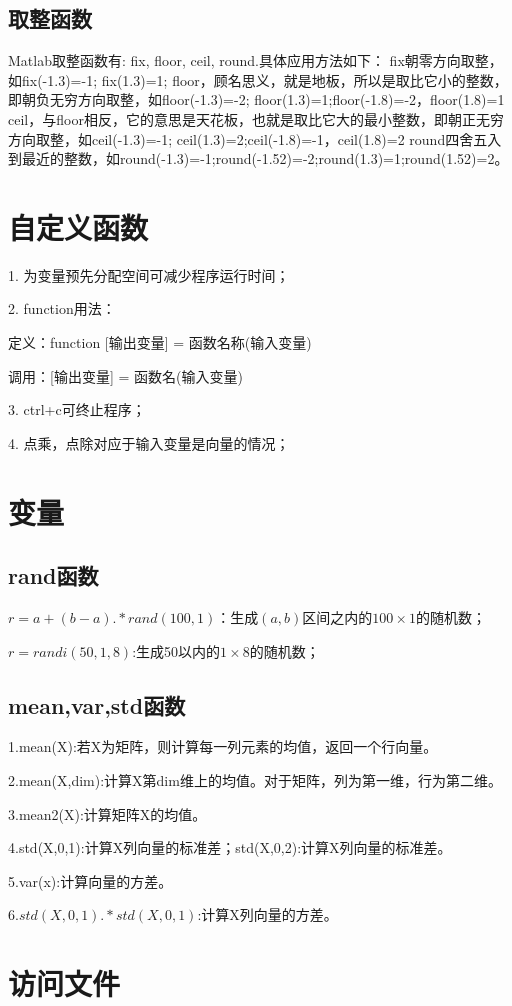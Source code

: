 \documentclass{ctexart}
\begin{document}
	\subsection{取整函数}
	Matlab取整函数有: fix, floor, ceil, round.具体应用方法如下：
	fix朝零方向取整，如fix(-1.3)=-1; fix(1.3)=1;
	floor，顾名思义，就是地板，所以是取比它小的整数，即朝负无穷方向取整，如floor(-1.3)=-2; floor(1.3)=1;floor(-1.8)=-2，floor(1.8)=1
	ceil，与floor相反，它的意思是天花板，也就是取比它大的最小整数，即朝正无穷方向取整，如ceil(-1.3)=-1; ceil(1.3)=2;ceil(-1.8)=-1，ceil(1.8)=2
	round四舍五入到最近的整数，如round(-1.3)=-1;round(-1.52)=-2;round(1.3)=1;round(1.52)=2。
	\section{自定义函数}
	1. 为变量预先分配空间可减少程序运行时间；
	
	2. function用法：
	
	定义：function [输出变量] = 函数名称(输入变量)
	
	调用：[输出变量] = 函数名(输入变量)
	
	3. ctrl+c可终止程序；
	
	4. 点乘，点除对应于输入变量是向量的情况；
	\section{变量}
	\subsection{rand函数}
	$ r=a+(b-a).*rand(100,1) $：生成$ (a,b) $区间之内的$ 100\times 1 $的随机数；
	
	$ r=randi(50,1,8) $:生成50以内的$ 1\times 8 $的随机数；
	\subsection{mean,var,std函数}
	1.mean(X):若X为矩阵，则计算每一列元素的均值，返回一个行向量。
	
	2.mean(X,dim):计算X第dim维上的均值。对于矩阵，列为第一维，行为第二维。
	
	3.mean2(X):计算矩阵X的均值。
	
	4.std(X,0,1):计算X列向量的标准差；std(X,0,2):计算X列向量的标准差。
	
	5.var(x):计算向量的方差。
	
	6.$ std(X,0,1).*std(X,0,1) $:计算X列向量的方差。
	\section{访问文件}
	
	
\end{document}
